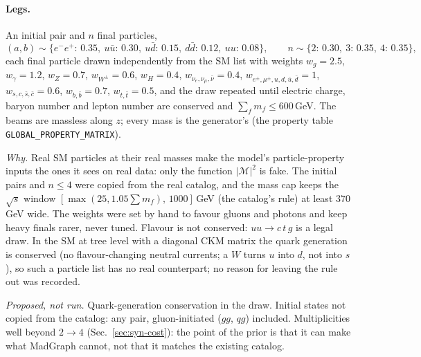 \documentclass[11pt]{article}
\newcommand{\code}[1]{\texttt{#1}}
\begin{document}
\paragraph{Legs.} An initial pair and $n$ final particles,
\begin{equation}
  (a,b)\sim\{e^-e^+\!:\,0.35,\ u\bar u\!:\,0.30,\ u\bar d\!:\,0.15,\ d\bar d\!:\,0.12,\ uu\!:\,0.08\},\qquad
  n\sim\{2\!:\,0.30,\ 3\!:\,0.35,\ 4\!:\,0.35\},
\end{equation}
each final particle drawn independently from the SM list with weights $w_g=2.5$, $w_\gamma=1.2$, $w_Z=0.7$,
$w_{W^\pm}=0.6$, $w_H=0.4$, $w_{\nu_e,\nu_\mu,\bar\nu}=0.4$, $w_{e^\pm,\mu^\pm,u,d,\bar u,\bar d}=1$,
$w_{s,c,\bar s,\bar c}=0.6$, $w_{b,\bar b}=0.7$, $w_{t,\bar t}=0.5$, and the draw repeated until electric charge,
baryon number and lepton number are conserved and $\sum_{f}m_f\le600$\,GeV. The beams are massless along $z$; every mass
is the generator's (the property table \code{GLOBAL\_PROPERTY\_MATRIX}).
\par\smallskip\noindent \emph{Why.} Real SM particles at their real masses make the model's particle-property inputs the ones it sees on real
data: only the function $|\mathcal M|^2$ is fake. The initial pairs and $n\le4$ were copied from the real catalog, and the
mass cap keeps the $\sqrt s$ window $[\max(25,1.05\sum m_f),\,1000]$\,GeV (the catalog's rule) at least $370$\,GeV wide.
The weights were set by hand to favour gluons and photons and keep heavy finals rarer, never tuned. Flavour is not
conserved: $uu\to c\,t\,g$ is a legal draw. In the SM at tree level with a diagonal CKM matrix the quark generation is
conserved (no flavour-changing neutral currents; a $W$ turns $u$ into $d$, not into $s$), so such a particle list has no
real counterpart; no reason for leaving the rule out was recorded.
\par\smallskip\noindent \emph{Proposed, not run.} Quark-generation conservation in the draw. Initial states not copied from the catalog: any
pair, gluon-initiated ($gg$, $qg$) included. Multiplicities well beyond $2\to4$ (Sec.~\ref{sec:syn-cost}): the point of
the prior is that it can make what MadGraph cannot, not that it matches the existing catalog.
\end{document}

